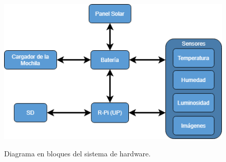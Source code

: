 \begin{figure}[H]
	\centering
	\includegraphics[width=0.7\linewidth]{ImagenesIngenieria de Detalle/DiagramaHardware}
	\label{fig:diagrama_hardware}
	\caption{Diagrama en bloques del sistema de hardware.}
\end{figure}